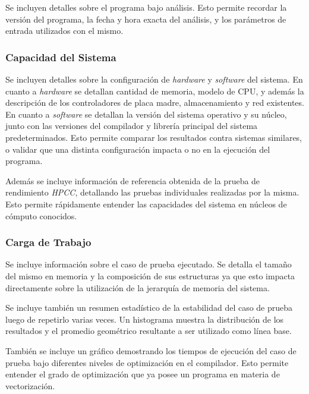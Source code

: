 \documentclass[a4paper]{report}
\begin{document}
Se incluyen detalles sobre el programa bajo análisis. Esto permite recordar la versión del programa, la fecha y hora exacta del análisis, y los parámetros de entrada utilizados con el mismo.

\subsubsection{Capacidad del Sistema}

Se incluyen detalles sobre la configuración de {\it hardware} y {\it software} del sistema.
En cuanto a {\it hardware} se detallan cantidad de memoria, modelo de CPU, y además la descripción de los controladores de placa madre, almacenamiento y red existentes.
En cuanto a {\it software} se detallan la versión del sistema operativo y su núcleo, junto con las versiones del compilador y librería principal del sistema predeterminados.
Esto permite comparar los resultados contra sistemas similares, o validar que una distinta configuración impacta o no en la ejecución del programa.

\bigskip

Además se incluye información de referencia obtenida de la prueba de rendimiento {\it HPCC}, detallando las pruebas individuales realizadas por la misma.
Esto permite rápidamente entender las capacidades del sistema en núcleos de cómputo conocidos.

\subsubsection{Carga de Trabajo}

Se incluye información sobre el caso de prueba ejecutado.
Se detalla el tamaño del mismo en memoria y la composición de sus estructuras ya que esto impacta directamente sobre la utilización de la jerarquía de memoria del sistema.

\bigskip

Se incluye también un resumen estadístico de la estabilidad del caso de prueba luego de repetirlo varias veces.
Un histograma muestra la distribución de los resultados y el promedio geométrico resultante a ser utilizado como línea base.

\bigskip

También se incluye un gráfico demostrando los tiempos de ejecución del caso de prueba bajo diferentes niveles de optimización en el compilador.
Esto permite entender el grado de optimización que ya posee un programa en materia de vectorización.
\end{document}
